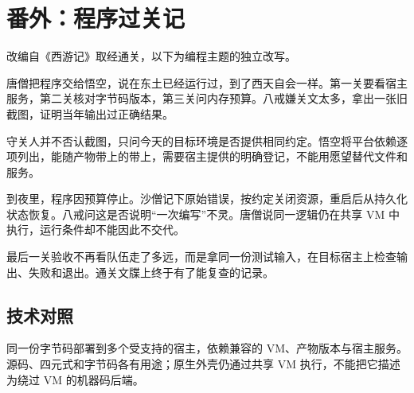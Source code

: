 \section{番外：程序过关记}

改编自《西游记》取经通关，以下为编程主题的独立改写。

唐僧把程序交给悟空，说在东土已经运行过，到了西天自会一样。第一关要看宿主服务，第二关核对字节码版本，第三关问内存预算。八戒嫌关文太多，拿出一张旧截图，证明当年输出过正确结果。

守关人并不否认截图，只问今天的目标环境是否提供相同约定。悟空将平台依赖逐项列出，能随产物带上的带上，需要宿主提供的明确登记，不能用愿望替代文件和服务。

到夜里，程序因预算停止。沙僧记下原始错误，按约定关闭资源，重启后从持久化状态恢复。八戒问这是否说明“一次编写”不灵。唐僧说同一逻辑仍在共享 VM 中执行，运行条件却不能因此不交代。

最后一关验收不再看队伍走了多远，而是拿同一份测试输入，在目标宿主上检查输出、失败和退出。通关文牒上终于有了能复查的记录。

\subsection*{技术对照}

同一份字节码部署到多个受支持的宿主，依赖兼容的 VM、产物版本与宿主服务。源码、四元式和字节码各有用途；原生外壳仍通过共享 VM 执行，不能把它描述为绕过 VM 的机器码后端。
